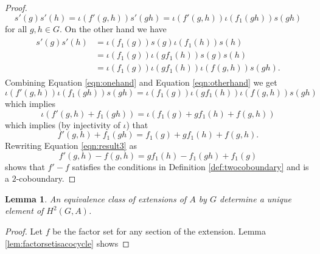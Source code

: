 \documentclass{dcthesis}
\newcommand{\mm}[1]{{\color{blue} \sf MM: [#1]}}
\newtheorem{lemma}[prop]{Lemma}
\theoremstyle{definition}
\theoremstyle{remark}
\numberwithin{equation}{section}
\numberwithin{figure}{section}
\begin{document}
{{\begin{proof}
\begin{equation}
        \label{eqn:onehand}
        s'(g)s'(h)=
        \iota(f'(g,h))s'(gh)=
        \iota(f'(g,h))\iota(f_1(gh))s(gh)
      \end{equation}
      for all $g,h\in G$.
      On the other hand we have
      \begin{align}
        \label{eqn:otherhand}
        \begin{split}
          s'(g)s'(h)
          &=\iota(f_1(g))s(g)\iota(f_1(h))s(h)\\
          &=\iota(f_1(g))\iota(gf_1(h))s(g)s(h)\\
          &=\iota(f_1(g))\iota(gf_1(h))\iota(f(g,h))s(gh).
        \end{split}
      \end{align}
      Combining Equation \ref{eqn:onehand}
      and
      Equation \ref{eqn:otherhand}
      we get
      \begin{equation}
        \label{eqn:result1}
        \iota(f'(g,h))\iota(f_1(gh))s(gh)
        =\iota(f_1(g))\iota(gf_1(h))\iota(f(g,h))s(gh)
      \end{equation}
      which implies
      \begin{equation}
        \label{eqn:result2}
        \iota(f'(g,h)+f_1(gh))
        =\iota(f_1(g)+gf_1(h)+f(g,h))
      \end{equation}
      which implies (by injectivity of $\iota$)
      that
      \begin{equation}
        \label{eqn:result3}
        f'(g,h)+f_1(gh)
        =f_1(g)+gf_1(h)+f(g,h).
      \end{equation}
      Rewriting Equation \ref{eqn:result3} as
      \begin{equation}
        \label{eqn:result4}
        f'(g,h)-f(g,h)=gf_1(h)-f_1(gh)+f_1(g)
      \end{equation}
      shows that $f'-f$ satisfies
      the conditions in
      Definition \ref{def:twocoboundary}
      and is a $2$-coboundary.
    \end{proof}
    \begin{lemma}
      \label{lem:equivalentextensionssamecohomologyclass}
      An equivalence class of extensions of $A$ by $G$
      determine a unique element of
      $H^2(G,A)$.
    \end{lemma}
    \begin{proof}
      Let $f$ be the factor set for
      any section of the extension.
      Lemma \ref{lem:factorsetisacocycle} shows

\end{proof}}}
\end{document}
